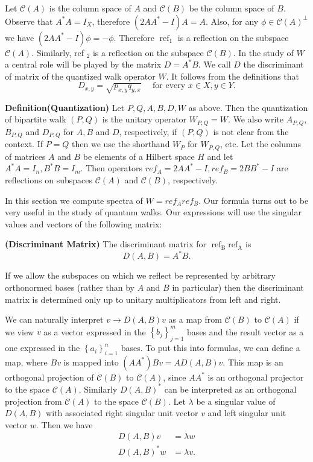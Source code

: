 Let $\mathcal{C}(A)$ is the column space of $A$ and $\mathcal{C}(B)$ be the column space of $B$. Observe that $A^* A=I_X$, therefore $\left(2 A A^*-I\right) A=A$. Also, for any $\phi \in \mathcal{C}(A)^{\perp}$ we have $\left(2 A A^*-I\right) \phi=-\phi$. Therefore $\operatorname{ref}_1$ is a reflection on the subspace $\mathcal{C}(A)$. Similarly, ref ${ }_2$ is a reflection on the subspace $\mathcal{C}(B)$. In the study of $W$ a central role will be played by the matrix $D=A^* B$. We call $D$ the discriminant of matrix of the quantized walk operator $W$. It follows from the definitions that
$$
D_{x, y}=\sqrt{p_{x, y} q_{y, x}} \quad \text { for every } x \in X, y \in Y .
$$
\begin{flushleft}
	

\textbf{Definition(Quantization)} Let $P, Q, A, B, D, W$ as above. Then the quantization of bipartite walk $(P, Q)$ is the unitary operator $W_{P, Q}=W$. We also write $A_{P, Q}$, $B_{P, Q}$ and $D_{P, Q}$ for $A, B$ and $D$, respectively, if $(P, Q)$ is not clear from the context. If $P=Q$ then we use the shorthand $W_P$ for $W_{P, Q}$, etc.
Let the columns of matrices $A$ and $B$ be elements of a Hilbert space $H$ and let $A^* A=I_n, B^* B=I_m$. Then operators $r e f_A=2 A A^*-I, r e f_B=2 B B^*-I$ are reflections on subspaces $\mathcal{C}(A)$ and $\mathcal{C}(B)$, respectively. \end{flushleft}
In this section we compute spectra of $W=r e f_A r e f_B$.
 Our formula turns out to be very useful in the study of quantum walks. Our expressions will use the singular values and vectors of the following matrix:
 \begin{flushleft}
 	
 
\textbf{(Discriminant Matrix)} The discriminant matrix for $\operatorname{ref}_{\mathrm{B}} \mathrm{ref}_{\mathrm{A}}$ is
$$
D(A, B)=A^* B .
$$
\end{flushleft}
If we allow the subspaces on which we reflect be represented by arbitrary orthonormed bases (rather than by $A$ and $B$ in particular) then the discriminant matrix is determined only up to unitary multiplicators from left and right.

We can naturally interpret $v \rightarrow D(A, B) v$ as a map from $\mathcal{C}(B)$ to $\mathcal{C}(A)$ if we view $v$ as a vector expressed in the $\left\{b_j\right\}_{j=1}^m$ bases and the result vector as a one expressed in the $\left\{a_i\right\}_{i=1}^n$ bases. To put this into formulas, we can define a map, where $B v$ is mapped into $\left(A A^*\right) B v=A D(A, B) v$. This map is an orthogonal projection of $\mathcal{C}(B)$ to $\mathcal{C}(A)$, since $A A^*$ is an orthogonal projector to the space $\mathcal{C}(A)$. Similarly $D(A, B)^*$ can be interpreted as an orthogonal projection from $\mathcal{C}(A)$ to the space $\mathcal{C}(B)$. Let $\lambda$ be a singular value of $D(A, B)$ with associated right singular unit vector $v$ and left singular unit vector $w$. Then we have
$$
\begin{aligned}
	D(A, B) v & =\lambda w \\
	D(A, B)^* w & =\lambda v .
\end{aligned}
$$

